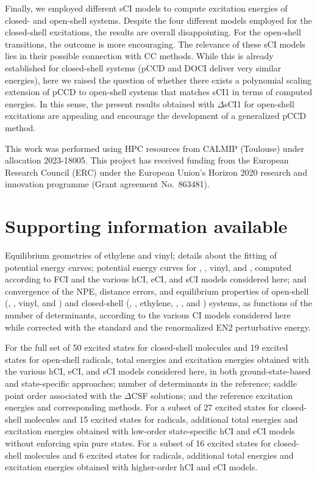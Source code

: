 \documentclass[aip,jcp,reprint,noshowkeys,superscriptaddress]{revtex4-1}
\begin{document}
Finally, we employed different sCI models to compute excitation energies of closed- and open-shell systems.
Despite the four different models employed for the closed-shell excitations, the results are overall disappointing.
For the open-shell transitions, the outcome is more encouraging.
The relevance of these sCI models lies in their possible connection with CC methods.
While this is already established for closed-shell systems (pCCD and DOCI deliver very similar energies), \cite{Bytautas_2011,Allen_1962,Smith_1965,Veillard_1967,Kossoski_2021,Marie_2021}
here we raised the question of whether there exists a polynomial scaling extension of pCCD to open-shell systems that matches sCI1 in terms of computed energies.
In this sense, the present results obtained with $\Delta$sCI1 for open-shell excitations are appealing and encourage the development of a generalized pCCD method.

\begin{acknowledgements}
This work was performed using HPC resources from CALMIP (Toulouse) under allocation 2023-18005.
This project has received funding from the European Research Council (ERC) under the European Union's Horizon 2020 research and innovation programme (Grant agreement No.~863481).
\end{acknowledgements}

\section*{Supporting information available}
\label{sec:SI}

Equilibrium geometries of ethylene and vinyl; details about the fitting of potential energy curves;
potential energy curves for , , vinyl, and ,
computed according to FCI and the various hCI, eCI, and sCI models considered here;
and convergence of the NPE, distance errors, and equilibrium properties of
open-shell (, , vinyl, and )
and closed-shell (, , ethylene, , , and ) systems,
as functions of the number of determinants, according to the various CI models considered here while
corrected with the standard and the renormalized EN2 perturbative energy.

For the full set of 50 excited states for closed-shell molecules and 19 excited states for open-shell radicals,
total energies and excitation energies obtained with
the various hCI, eCI, and sCI models considered here, in both ground-state-based and state-specific approaches;
number of determinants in the reference; saddle point order associated with the $\Delta$CSF solutions;
and the reference excitation energies and corresponding methods.
For a subset of 27 excited states for closed-shell molecules and 15 excited states for radicals,
additional total energies and excitation energies obtained with low-order state-specific hCI and eCI models without enforcing spin pure states.
For a subset of 16 excited states for closed-shell molecules and 6 excited states for radicals,
additional total energies and excitation energies obtained with higher-order hCI and eCI models.
\end{document}

